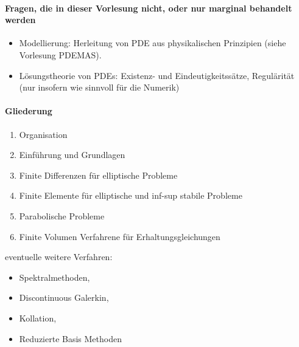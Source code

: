 \paragraph{Fragen, die in dieser Vorlesung nicht, oder nur marginal behandelt werden}

\begin{itemize}
	\item
		Modellierung: Herleitung von PDE aus physikalischen Prinzipien (siehe Vorlesung PDEMAS).
	\item
		Lösungstheorie von PDEs: Existenz- und Eindeutigkeitssätze, Regulärität (nur insofern wie sinnvoll für die Numerik)
\end{itemize}

\paragraph{Gliederung}

\begin{enumerate}[1.,start=0]
	\item
		Organisation
	\item
		Einführung und Grundlagen
	\item
		Finite Differenzen für elliptische Probleme
	\item
		Finite Elemente für elliptische und inf-sup stabile Probleme
	\item
		Parabolische Probleme
	\item
		Finite Volumen Verfahrene für Erhaltungsgleichungen
\end{enumerate}

eventuelle weitere Verfahren:
\begin{itemize}
	\item
		Spektralmethoden,
	\item
		Discontinuous Galerkin,
	\item
		Kollation,
	\item
		Reduzierte Basis Methoden
\end{itemize}

